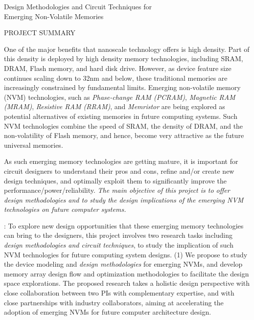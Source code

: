 \documentclass[11pt,letterpaper]{article}
\begin{document}
\begin{center}
{\Large Design Methodologies and Circuit Techniques for}\\
{\Large Emerging Non-Volatile Memories}\\
\end{center}
\begin{center}
{\large  PROJECT SUMMARY} \\
\end{center}

\normalsize
One of the major benefits that nanoscale technology offers is high density. Part of this density is deployed by high density memory technologies, including SRAM, DRAM, Flash memory, and hard disk drive. However, as device feature size continues scaling down to 32nm and below, these traditional memories are increasingly constrained by fundamental limits. Emerging non-volatile memory (NVM) technologies, such as \textit{Phase-change RAM (PCRAM)}, \textit{Magnetic RAM (MRAM)},  \textit{Resistive RAM (RRAM)}, and \textit{Memristor} are being explored as potential alternatives of existing memories in future computing systems. Such NVM technologies combine the speed of SRAM, the density of DRAM, and the non-volatility of Flash memory, and hence, become very attractive as the future universal memories. 

As such emerging memory technologies are getting mature, it is important for circuit designers to understand their pros and cons, refine and/or create new design techniques, and optimally exploit them to significantly improve the performance/power/reliability. \textit{The main objective of this project is to offer design methodologies and to study the design implications of the emerging NVM technologies on future computer systems.}

\vspace*{-2mm} 
{}: 
To explore new design opportunities that these emerging memory technologies can bring to the designers,  this project involves two research tasks including \emph{design methodologies and circuit techniques}, to study the implication of such NVM technologies for future computing system designs.  (1) We propose to study the device modeling and \textit{design methodologies} for emerging NVMs, and develop memory array design flow and optimization methodologies to facilitate the design space explorations. The proposed research takes a holistic design perspective with close collaboration between two PIs with complementary expertise, and with close partnerships with industry collaborators, aiming at accelerating the adoption of emerging NVMs for future computer architecture design.
\end{document}
